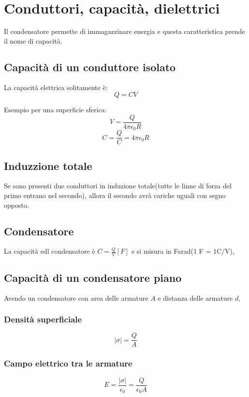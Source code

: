 \section{Conduttori, capacità, dielettrici}
Il condensatore permette di immagazzinare energia e questa caratteristica
prende il nome di capacità.

\subsection{Capacità di un conduttore isolato}
La capacità elettrica solitamente è:
\begin{equation}
    Q=CV
\end{equation}

Esempio per una superficie sferica:
\begin{equation*}
    V = \frac{Q}{4\pi\epsilon_0R}
\end{equation*}
\begin{equation*}
    C = \frac{Q}{C} = 4\pi\epsilon_0R
\end{equation*}

\subsection{Induzzione totale}

Se sono presenti due conduttori in induzione totale(tutte le linne 
di forza del primo entrano nel secondo),
allora il secondo avrà cariche uguali con segno opposto.

\subsection{Condensatore}

La capacità edl condensatore è $C = \frac{Q}{V}[F]$ e si misura in Farad(1 F = 1C/V),

\subsection{Capacità di un condensatore piano}
Avendo un condensatore con area delle armature $A$ e distanza delle armature $d$,
\subsubsection{Densità superficiale}
\begin{equation}
    |\sigma| = \frac{Q}{A}
\end{equation}

\subsubsection{Campo elettrico tra le armature}
\begin{equation}
    E = \frac{|\sigma|}{\epsilon_0} = \frac{Q}{\epsilon_0 A}
\end{equation}

